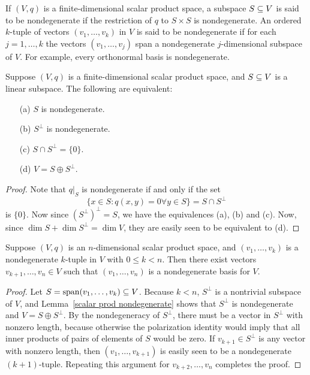 If $(V,q)$ is a finite-dimensional scalar product space, a subspace $S\subseteq V$ 
is said to be nondegenerate if the restriction of $q$ to $S\times S$ is nondegenerate. 
An ordered $k$-tuple of vectors $(v_1,\dots,v_k)$ in $V$ is said to be nondegenerate 
if for each $j=1,\dots,k$ the vectors $(v_1,\dots,v_j)$ span a nondegenerate 
$j$-dimensional subspace of $V$. For example, every orthonormal basis is nondegenerate.
\begin{lemma}\label{scalar prod nondegenerate}
Suppose $(V,q)$ is a finite-dimensional scalar product space, and $S\subseteq V$ is 
a linear subspace. The following are equivalent:
\begin{itemize}
\item[(a)] $S$ is nondegenerate.
\item[(b)] $S^{\bot}$ is nondegenerate.
\item[(c)] $S\cap S^{\bot}=\{0\}$.
\item[(d)] $V=S\oplus S^{\bot}$.   
\end{itemize}
\end{lemma}
\begin{proof}
Note that $q|_S$ is nondegenerate if and only if the set
\[\{x\in S:q(x,y)=0\forall y\in S\}=S\cap S^{\bot}\]
is $\{0\}$. Now since $(S^{\bot})^{\bot}=S$, we have the equivalences (a), (b) and (c). 
Now, since $\dim S+\dim S^{\bot}=\dim V$, they are easily seen to be equivalent to (d).
\end{proof}
\begin{lemma}\label{scalar prod complete nondegenerate base}
Suppose $(V,q)$ is an $n$-dimensional scalar product space, and $(v_1,\dots,v_k)$ 
is a nondegenerate $k$-tuple in $V$ with $0\leq k<n$. Then there exist vectors 
$v_{k+1},\dots,v_n\in V$ such that $(v_1,\dots,v_n)$ is a nondegenerate basis 
for $V$.
\end{lemma}
\begin{proof}
Let $S=\mathrm{span}(v_1,\dots,v_k)\subseteq V$. Because $k<n$, $S^{\bot}$ is a nontrivial 
subspace of $V$, and Lemma~\ref{scalar prod nondegenerate} shows that 
$S^{\bot}$ is nondegenerate and $V=S\oplus S^{\bot}$. By the nondegeneracy 
of $S^{\bot}$, there must be a vector in $S^{\bot}$ with nonzero length, 
because otherwise the polarization identity would imply that all inner 
products of pairs of elements of $S$ would be zero. If $v_{k+1}\in S^{\bot}$ 
is any vector with nonzero length, then $(v_1,\dots,v_{k+1})$ is easily 
seen to be a nondegenerate $(k+1)$-tuple. Repeating this argument for 
$v_{k+2},\dots,v_n$ completes the proof.
\end{proof}
